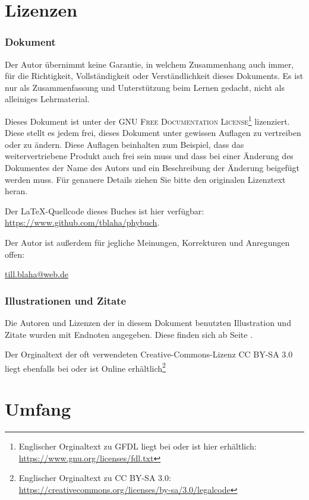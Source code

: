 \section*{Lizenzen}

\subsubsection*{Dokument}

Der Autor übernimmt keine Garantie, in welchem Zusammenhang auch immer, für die Richtigkeit, Vollständigkeit oder Verständlichkeit dieses Dokuments. Es ist nur als Zusammenfassung und Unterstützung beim Lernen gedacht, nicht als alleiniges Lehrmaterial.

Dieses Dokument ist unter der \textsc{GNU Free Documentation License}\footnote{Englischer Orginaltext zu \textsc{GFDL} liegt bei oder ist hier erhältlich: \url{https://www.gnu.org/licenses/fdl.txt}} lizenziert. Diese stellt es jedem frei, dieses Dokument unter gewissen Auflagen zu vertreiben oder zu ändern. Diese Auflagen beinhalten zum Beispiel, dass das weitervertriebene Produkt auch frei sein muss und dass bei einer Änderung des Dokumentes der Name des Autors und ein Beschreibung der Änderung beigefügt werden muss. Für genauere Details ziehen Sie bitte den originalen Lizenztext heran.

Der \LaTeX -Quellcode dieses Buches ist hier verfügbar: \url{https://www.github.com/tblaha/phybuch}.

Der Autor ist außerdem für jegliche Meinungen, Korrekturen und Anregungen offen:

\href{mailto:till.blaha@web.de}{till.blaha@web.de}


\subsubsection*{Illustrationen und Zitate}

Die Autoren und Lizenzen der in diesem Dokument benutzten Illustration und Zitate wurden mit Endnoten angegeben. Diese finden sich ab Seite \pageref{endnotes}.

Der Orginaltext der oft verwendeten \glqq Creative-Commons\grqq -Lizenz \textsc{CC BY-SA 3.0} liegt ebenfalls bei oder ist Online erhältlich\footnote{Englischer Orginaltext zu \textsc{CC BY-SA 3.0}: \url{https://creativecommons.org/licenses/by-sa/3.0/legalcode}}


\section*{Umfang}

